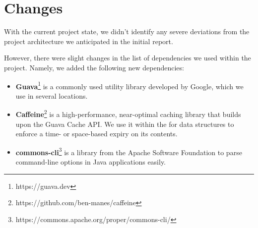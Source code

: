 \section{Changes}\label{sec:objective}

With the current project state, we didn't identify any severe deviations from the project architecture
we anticipated in the initial report.

However, there were slight changes in the list of dependencies we used within the project.
Namely, we added the following new dependencies:

\begin{itemize}
    \setlength\itemsep{0em}
    \item \textbf{Guava}\footnote{https://guava.dev} is a commonly used utility library developed by Google, which
    we use in several locations.
    \item \textbf{Caffeine}\footnote{https://github.com/ben-manes/caffeine} is a high-performance, near-optimal
    caching library that builds upon the Guava Cache API\@.
    We use it within the  for data structures to enforce a time- or
    space-based expiry on its contents.
    \item \textbf{commons-cli}\footnote{https://commons.apache.org/proper/commons-cli/} is a library from the
    Apache Software Foundation to parse command-line options in Java applications easily.
\end{itemize}

